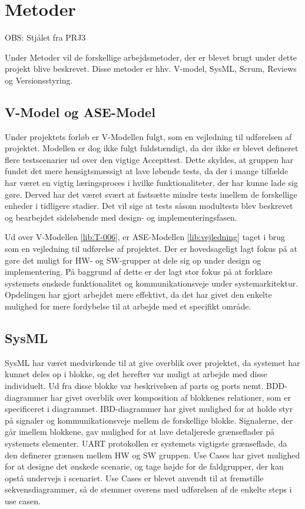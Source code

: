 \section{Metoder} \label{ch:Metoder}

OBS: Stjålet fra PRJ3

Under Metoder vil de forskellige arbejdsmetoder, der er blevet brugt under dette projekt blive beskrevet. Disse metoder er hhv. V-model, SysML, Scrum, Reviews og Versionsstyring.

\subsection{V-Model og ASE-Model} 
Under projektets forløb er V-Modellen fulgt, som en vejledning til udførelsen af projektet. Modellen er dog ikke fulgt fuldstændigt, da der ikke er blevet defineret flere testscenarier ud over den vigtige Accepttest. Dette skyldes, at gruppen har fundet det mere hensigtsmæssigt at lave løbende tests, da der i mange tilfælde har været en vigtig læringsproces i hvilke funktionaliteter, der har kunne lade sig gøre. Derved har det været svært at fastsætte mindre tests imellem de forskellige enheder i tidligere stadier. Det vil sige at tests såsom modultests blev beskrevet og bearbejdet sideløbende med design- og implementeringsfasen.

Ud over V-Modellen \ref{lib:T-006}, er ASE-Modellen \ref{lib:vejledning} taget i brug som en vejledning til udførelse af projektet. Der er hovedsageligt lagt fokus på at gøre det muligt for HW- og SW-grupper at dele sig op under design og implementering. På baggrund af dette er der lagt stor fokus på at forklare systemets ønskede funktionalitet og kommunikationsveje under systemarkitektur. Opdelingen har gjort arbejdet mere effektivt, da det har givet den enkelte mulighed for mere fordybelse til at arbejde med et specifikt område.

\subsection{SysML}
SysML har været medvirkende til at give overblik over projektet, da systemet har kunnet deles op i blokke, og det herefter var muligt at arbejde med disse individuelt. Ud fra disse blokke var beskrivelsen af parts og ports nemt. BDD-diagrammer har givet overblik over komposition af blokkenes relationer, som er specificeret i diagrammet. IBD-diagrammer har givet mulighed for at holde styr på signaler og kommunikationsveje mellem de forskellige blokke. Signalerne, der går imellem blokkene, gav mulighed for at lave detaljerede grænseflader på systemets elementer. UART protokollen er systemets vigtigste grænseflade, da den definerer grænsen mellem HW og SW gruppen. Use Cases har givet mulighed for at designe det ønskede scenarie, og tage højde for de faldgrupper, der kan opstå undervejs i scenariet. Use Cases er blevet anvendt til at fremstille sekvensdiagrammer, så de stemmer overens med udførelsen af de enkelte steps i use casen.

